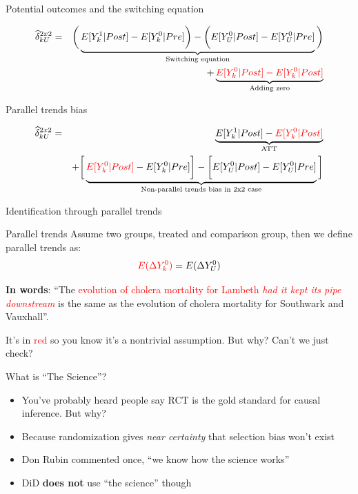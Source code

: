 \documentclass{beamer}
\begin{document}
\begin{frame}{Potential outcomes and the switching equation}

\begin{eqnarray*}
\widehat{\delta}^{2x2}_{kU} &=& \bigg ( \underbrace{E[Y^1_k|Post] - E[Y^0_k|Pre] \bigg ) - \bigg ( E[Y^0_U | Post ] - E[ Y^0_U | Pre]}_{\mathclap{\text{Switching equation}}} \bigg)  \\
&&+ \underbrace{\textcolor{red}{E[Y_k^0 |Post] - E[Y^0_k | Post]}}_{\mathclap{\text{Adding zero}}} 
\end{eqnarray*}

\end{frame}

\begin{frame}{Parallel trends bias}

\begin{eqnarray*}
\widehat{\delta}^{2x2}_{kU} &=& \underbrace{E[Y^1_k | Post] - \textcolor{red}{E[Y^0_k | Post]}}_{\mathclap{\text{ATT}}} \\
&& + \bigg [  \underbrace{\textcolor{red}{E[Y^0_k | Post]} - E[Y^0_k | Pre] \bigg ] - \bigg [ E[Y^0_U | Post] - E[Y_U^0 | Pre] }_{\mathclap{\text{Non-parallel trends bias in 2x2 case}}} \bigg ]
\end{eqnarray*}


\end{frame}

\begin{frame}{Identification through parallel trends}
	

	\begin{block}{Parallel trends}
	Assume two groups, treated and comparison group, then we define parallel trends as:	 $$\textcolor{red}{E(}\textcolor{red}{\Delta Y^0_k)} = E(\Delta Y^0_U)$$
	\end{block}

\textbf{In words}: ``The \textcolor{red}{evolution of cholera mortality for Lambeth \emph{had it kept its pipe downstream}} is the same as the evolution of cholera mortality for Southwark and Vauxhall''.  

\bigskip

It's in \textcolor{red}{red} so you know it's a nontrivial assumption.  But why?  Can't we just check?

	

	
\end{frame}




\begin{frame}{What is ``The Science''?}

\begin{itemize}
\item You've probably heard people say RCT is the gold standard for causal inference.  But why?
\item Because randomization gives \emph{near certainty} that selection bias won't exist
\item Don Rubin commented once, ``we know how the science works''
\item DiD \textbf{does not} use ``the science'' though
\end{itemize}

\end{frame}
\end{document}
